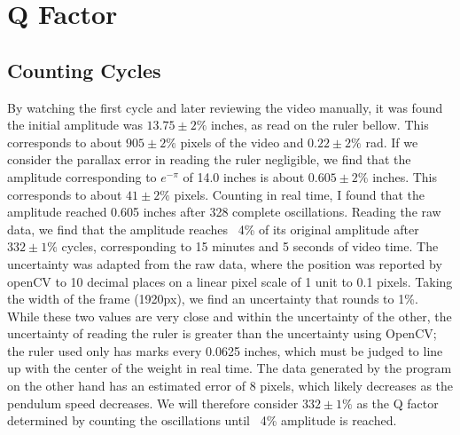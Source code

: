 \documentclass[11pt]{article}
\begin{document}
    \section{Q Factor}
        \subsection{Counting Cycles}
            By watching the first cycle and later reviewing the video manually, it was found the initial amplitude was  $13.75 \pm 2\%$ inches, as read on the ruler bellow. This corresponds to about $905 \pm 2\%$ pixels of the video and $0.22 \pm 2\%$ rad. If we consider the parallax error in reading the ruler negligible, we find that the amplitude corresponding to $e^{-\pi}$ of 14.0 inches is about $0.605 \pm 2\%$ inches. This corresponds to about $41 \pm 2\%$ pixels. Counting in real time, I found that the amplitude reached 0.605 inches after 328 complete oscillations. Reading the raw data, we find that the amplitude reaches ~4\% of its original amplitude after $332 \pm 1\%$ cycles, corresponding to 15 minutes and 5 seconds of video time. The uncertainty was adapted from the raw data, where the position was reported by openCV to 10 decimal places on a linear pixel scale of 1 unit to 0.1 pixels. Taking the width of the frame (1920px), we find an uncertainty that rounds to 1\%. While these two values are very close and within the uncertainty of the other, the uncertainty of reading the ruler is greater than the uncertainty using OpenCV; the ruler used only has marks every 0.0625 inches, which must be judged to line up with the center of the weight in real time. The data generated by the program on the other hand has an estimated error of 8 pixels, which likely decreases as the pendulum speed decreases. We will therefore consider $332 \pm 1\%$ as the Q factor determined by counting the oscillations until ~4\% amplitude is reached. 
        
\end{document}
